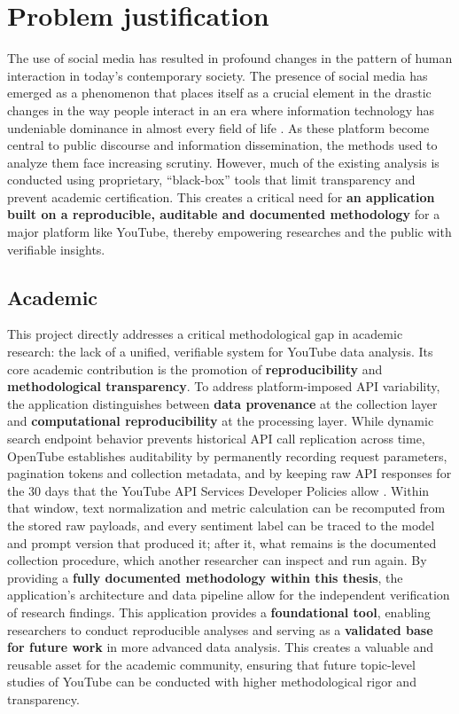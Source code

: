 \chapter{Problem justification}
\label{chap:justification}

The use of social media has resulted in profound changes in the pattern of human interaction in today's contemporary society. The presence of social media has emerged as a phenomenon that places itself as a crucial element in the drastic changes in the way people interact in an era where information technology has undeniable dominance in almost every field of life \autocite{azzaakiyyah2023impact}. As these platform become central to public discourse and information dissemination, the methods used to analyze them face increasing scrutiny. However, much of the existing analysis is conducted using proprietary, \enquote{black-box} tools that limit transparency and prevent academic certification. This creates a critical need for \textbf{an application built on a reproducible, auditable and documented methodology} for a major platform like YouTube, thereby empowering researches and the public with verifiable insights.

\section{Academic}

This project directly addresses a critical methodological gap in academic research: the lack of a unified, verifiable system for YouTube data analysis. Its core academic contribution is the promotion of \textbf{reproducibility} and \textbf{methodological transparency}. To address platform-imposed API variability, the application distinguishes between \textbf{data provenance} at the collection layer and \textbf{computational reproducibility} at the processing layer. While dynamic search endpoint behavior prevents historical API call replication across time, OpenTube establishes auditability by permanently recording request parameters, pagination tokens and collection metadata, and by keeping raw API responses for the 30 days that the YouTube API Services Developer Policies allow \autocite{youtube_api_services_developer_policies}. Within that window, text normalization and metric calculation can be recomputed from the stored raw payloads, and every sentiment label can be traced to the model and prompt version that produced it; after it, what remains is the documented collection procedure, which another researcher can inspect and run again. By providing a \textbf{fully documented methodology within this thesis}, the application's architecture and data pipeline allow for the independent verification of research findings. This application provides a \textbf{foundational tool}, enabling researchers to conduct reproducible analyses and serving as a \textbf{validated base for future work} in more advanced data analysis. This creates a valuable and reusable asset for the academic community, ensuring that future topic-level studies of YouTube can be conducted with higher methodological rigor and transparency.

